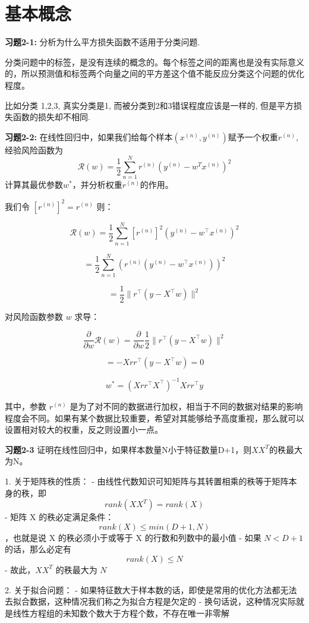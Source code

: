 \section{基本概念}

\noindent\textbf{习题2-1:} 分析为什么平方损失函数不适用于分类问题.

分类问题中的标签，是没有连续的概念的。每个标签之间的距离也是没有实际意义的，所以预测值和标签两个向量之间的平方差这个值不能反应分类这个问题的优化程度。

比如分类 1,2,3, 真实分类是1, 而被分类到2和3错误程度应该是一样的, 但是平方损失函数的损失却不相同.

\noindent\textbf{习题2-2:} 在线性回归中，如果我们给每个样本$(x^{(n)},y^{(n)})$赋予一个权重$r^{(n)}$,
经验风险函数为
\begin{equation}
\mathcal{R}(w) = \frac{1}{2}\sum_{n=1}^N r^{(n)}(y^{(n)} - w^T x^{(n)})^2
\end{equation}
计算其最优参数$w^{*}$，并分析权重$r^{(n)}$的作用。

我们令 $[r^{(n)}]^2 = r^{(n)}$ 则：

\[\mathcal{R}(w) = \frac{1}{2}\sum_{n=1}^N [r^{(n)}]^2(y^{(n)} - w^\top x^{(n)})^2\]

\[= \frac{1}{2}\sum_{n=1}^N \left(r^{(n)}(y^{(n)} - w^\top x^{(n)})\right)^2\]

\[= \frac{1}{2}\|r^\top(y - X^\top w)\|^2\]

对风险函数参数 $w$ 求导：

\[\frac{\partial}{\partial w}\mathcal{R}(w) = \frac{\partial}{\partial w}\frac{1}{2}\|r^\top(y - X^\top w)\|^2\]

\[= -Xrr^\top(y - X^\top w) = 0\]

\[w^* = (Xrr^\top X^\top)^{-1}Xrr^\top y\]

其中，参数 $r^{(n)}$ 是为了对不同的数据进行加权，相当于不同的数据对结果的影响程度会不同。如果有某个数据比较重要，希望对其能够给予高度重视，那么就可以设置相对较大的权重，反之则设置小一点。

\noindent\textbf{习题2-3} 证明在线性回归中，如果样本数量N小于特征数量D+1，则$XX^T$的秩最大为N。

1. 关于矩阵秩的性质：
- 由线性代数知识可知矩阵与其转置相乘的秩等于矩阵本身的秩，即 \[rank(XX^T) = rank(X)\]
- 矩阵 X 的秩必定满足条件：\[rank(X) \leq min(D+1, N)\]，也就是说 X 的秩必须小于或等于 X 的行数和列数中的最小值
- 如果 $N < D+1$ 的话，那么必定有 \[rank(X) \leq N\]
- 故此，$XX^T$ 的秩最大为 $N$

2. 关于拟合问题：
- 如果特征数大于样本数的话，即使是常用的优化方法都无法去拟合数据，这种情况我们称之为拟合方程是欠定的
- 换句话说，这种情况实际就是线性方程组的未知数个数大于方程个数，不存在唯一非零解

